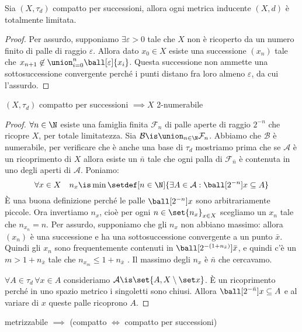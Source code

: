 \begin{prop}
	Sia $(X,\tau _d)$ compatto per successioni, allora ogni metrica inducente $(X,d)$ è totalmente limitata.
\end{prop}

\begin{proof}
	Per assurdo, supponiamo $\exists \varepsilon > 0$ tale che $X$ non è ricoperto da un numero finito di palle di raggio $\varepsilon$.
	Allora dato $x_0 \in X$ esiste una successione $(x_n)$ tale che
	$x_{n+1}\not\in\union_{i=0}^n\ball[\varepsilon]{x_i}$.
	Questa successione non ammette una sottosuccessione convergente perché i punti distano fra loro almeno $\varepsilon$, da cui l'assurdo.
\end{proof}

\begin{prop}
	$(X, \tau _d)$ compatto per successioni $\implies X$ 2-numerabile
\end{prop}

\begin{proof}
	$\forall n \in \N$ esiste una famiglia finita $\mathcal{F}_n$ di palle aperte di raggio $2^{-n}$ che ricopre $X$, per totale limitatezza.
	Sia $\mathcal{B} \is \union _{n \in \N} \mathcal F_n$.
	Abbiamo che $\mathcal{B}$ è numerabile, per verificare che è anche una base di $\tau _d$ mostriamo prima che se $\mathcal{A}$ è un ricoprimento di $X$ allora esiste un $\bar n$ tale che ogni palla di $\mathcal F_{\bar n}$ è contenuta in uno degli aperti di $\mathcal{A}$.
	Poniamo:
	\[\forall x\in X\quad n_x\is\min\setdef[n\in\N]{\exists A\in\mathcal A:\ball[2^{-n}]x\subseteq A}\]
	È una buona definizione perché le palle $\ball[2^{-n}]x$ sono arbitrariamente piccole.
	Ora invertiamo $n_x$, cioè per ogni $n\in\set{n_x}_{x\in X}$ scegliamo un $x_n$ tale che $n_{x_n}=n$.
	Per assurdo, supponiamo che gli $n_x$ non abbiano massimo: allora $(x_n)$ è una successione e ha una sottosuccessione convergente a un punto $\bar x$.
	Quindi gli $x_n$ sono frequentemente contenuti in $\ball[2^{-(1+n_{\bar x})}]{\bar x}$, e quindi c'è un $m>1+n_{\bar x}$ tale che $n_{x_m}\le 1+n_{\bar x}$ \absurd.
	Il massimo degli $n_x$ è $\bar n$ che cercavamo.
	
	$\forall A \in \tau _d\,\forall x \in A$ consideriamo $\mathcal{A}\is\set{A, X\setminus\set x}$.
	È un ricoprimento perché in uno spazio metrico i singoletti sono chiusi.
	Allora $\ball[2^{-\bar n}]x\subseteq A$ e al variare di $x$ queste palle ricoprono $A$.
\end{proof}

\begin{cor}
	metrizzabile $\implies$ (compatto $\iff$ compatto per successioni)
\end{cor}

